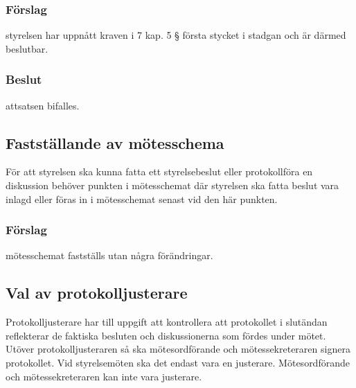 \documentclass[protokoll]{dvd}
\begin{document}
        \subsubsection*{Förslag}

        \begin{attsatser}
            \item styrelsen har uppnått kraven i 7 kap. 5 § första stycket i stadgan och är därmed beslutbar.
        \end{attsatser}

        \subsubsection*{Beslut}

        \begin{attsatser}
            \item attsatsen bifalles.
        \end{attsatser}

    \subsection{Fastställande av mötesschema}

        För att styrelsen ska kunna fatta ett styrelsebeslut eller protokollföra en diskussion behöver punkten i mötesschemat där styrelsen ska fatta beslut vara inlagd eller föras in i mötesschemat senast vid den här punkten.

        \subsubsection*{Förslag}

        \begin{attsatser}
            \item mötesschemat fastställs utan några förändringar.
        \end{attsatser}


    \subsection{Val av protokolljusterare}

        Protokolljusterare har till uppgift att kontrollera att protokollet i slutändan reflekterar de faktiska besluten och diskussionerna som fördes under mötet.
        Utöver protokolljusteraren så ska mötesordförande och mötessekreteraren signera protokollet.
        Vid styrelsemöten ska det endast vara en justerare.
        Mötesordförande och mötessekreteraren kan inte vara justerare.
\end{document}
